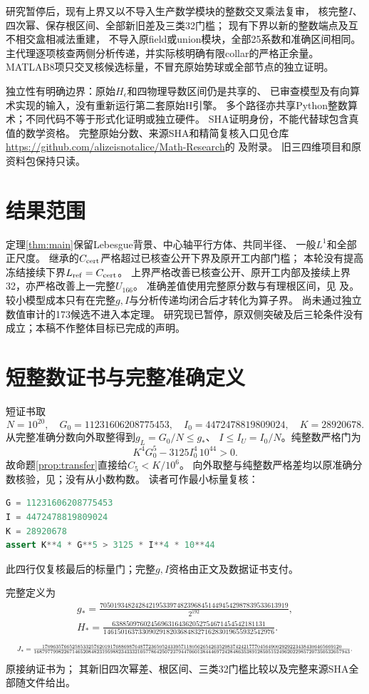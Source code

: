 \documentclass[UTF8,fontset=fandol,zihao=-4,a4paper]{ctexart}
\newcommand{\1}{\mathbf 1}
\begin{document}
研究暂停后，现有上界又以不导入生产数学模块的整数交叉乘法复审，
核完整$I$、四次幂、保存根区间、全部新旧差及三类32门槛；
现有下界以新的整数端点及互不相交盒相减法重建，
不导入原field或union模块，全部25系数和准确区间相同。
主代理逐项核查两侧分析传递，并实际核明确有限collar的严格正余量。
MATLAB8项只交叉核候选标量，不冒充原始势球或全部节点的独立证明。

独立性有明确边界：原始$H_\epsilon$和四物理导数区间仍是共享的、
已审查模型及有向算术实现的输入，没有重新运行第二套原始H引擎。
多个路径亦共享Python整数算术；不同代码不等于形式化证明或独立硬件。
SHA证明身份，不能代替球包含真值的数学资格。
完整原始分数、来源SHA和精简复核入口见仓库
\url{https://github.com/alizeisnotalice/Math-Research}的
及附录。
旧三四维项目和原资料包保持只读。

\section{结果范围}
定理\ref{thm:main}保留Lebesgue背景、中心轴平行方体、共同半径、
一般$L^1$和全部正尺度。
继承的$C_{\rm cert}$严格超过已核查公开下界及原开工内部门槛；
本轮没有提高冻结接续下界$L_{\rm ref}=C_{\rm cert}$。
上界严格改善已核查公开、原开工内部及接续上界32，亦严格改善上一完整$U_{166}$。
准确差值使用完整原分数与有理根区间，见
及。
较小模型成本只有在完整$g,I$与分析传递均闭合后才转化为算子界。
尚未通过独立数值审计的173候选不进入本定理。
研究现已暂停，原双侧突破及后三轮条件没有成立；本稿不作整体目标已完成的声明。

\appendix
\section{短整数证书与完整准确定义}
短证书取
\[
 N=10^{20},\quad G_0=11231606208775453,\quad
 I_0=4472478819809024,\quad K=28920678.
\]
从完整准确分数向外取整得到$g_L=G_0/N\le g_*$、
$I\le I_U=I_0/N$。纯整数严格门为
\[
 K^4G_0^5-3125I_0^4\,10^{44}>0.
\]
故命题\ref{prop:transfer}直接给$C_5<K/10^6$。
向外取整与纯整数严格差均以原准确分数核验，见；没有从小数构数。
读者可作最小标量复核：
\begin{lstlisting}[language=Python]
G = 11231606208775453
I = 4472478819809024
K = 28920678
assert K**4 * G**5 > 3125 * I**4 * 10**44
\end{lstlisting}
此四行仅复核最后的标量门；完整$g,I$资格由正文及数据证书支付。

完整定义为
\[
 \begin{gathered}
 g_*=\frac{705019348242842195339748239684514494542987839533613919}{2^{192}},
 \\
 H_*=\frac{63885097602456963164362052754671454542181131}
 {1461501637330902918203684832716283019655932542976}.
 \end{gathered}
\]
\[
\resizebox{.98\textwidth}{!}{$
 J_*=
 \frac{17096357665258533257620191768869876487723650524339571180562654263529837424217770456490029292234384306465669120}
 {16879779982267146520848231959882343332105778642507237944706013844469724284863538912850515249620229857207350532657943}.
$}
\]
原接纳证书为；
其新旧四次幂差、根区间、三类32门槛比较以及完整来源SHA全部随文件给出。
\end{document}

